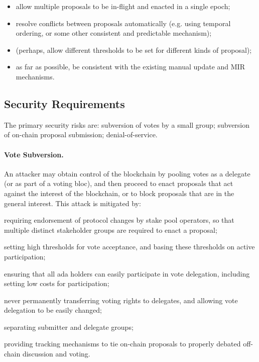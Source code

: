 \begin{itemize}
\item
  allow multiple proposals to be in-flight and enacted in a single epoch;
\item
  resolve conflicts between proposals automatically (e.g. using temporal ordering, or some other consistent and predictable mechanism);
\item
  (perhaps, allow different thresholds to be set for different kinds of proposal);
\item
  as far as possible, be consistent with the existing manual update and MIR mechanisms.
\end{itemize}

\pagebreak
\subsection{Security Requirements}

The primary security risks are: subversion of votes by a small group; subversion of on-chain proposal submission; denial-of-service.

\paragraph{Vote Subversion.}
An attacker may obtain control of the blockchain by pooling votes as a delegate (or as part of a voting bloc), and then proceed to enact proposals that act against the interest of the blockchain, or to block
proposals that are in the general interest.   This attack is mitigated by:
  \begin{inparaenum}
  \item
    requiring endorsement of protocol changes by stake pool operators, so that multiple distinct stakeholder groups are required to enact a proposal;
  \item
    setting high thresholds for vote acceptance, and basing these thresholds on active participation;
  \item
    ensuring that all ada holders can easily participate in vote delegation, including setting low costs for participation;
  \item
    never permanently transferring voting rights to delegates, and allowing vote delegation to be easily changed;
  \item
    separating submitter and delegate groups;
  \item
    providing tracking mechanisms to tie on-chain proposals to properly debated off-chain discussion and voting.
  \end{inparaenum}

